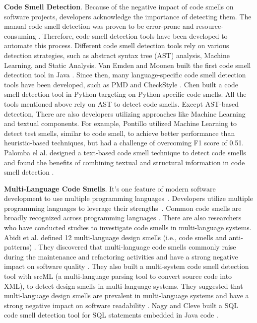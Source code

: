 {\bf Code Smell Detection}. Because of the negative impact of code smells on
software projects, developers acknowledge the importance of detecting them. The
manual code smell detection was proven to be error-prone and resource-consuming
\cite{DetectingDefectsInObject}. Therefore, code smell detection tools have been
developed to automate this process. Different code smell detection tools rely on
various detection strategies, such as abstract syntax tree (AST) analysis,
Machine Learning, and Static Analysis. Van Emden and Moonen built the first code
smell detection tool in Java \cite{1173068}. Since then, many language-specific
code smell detection tools have been developed, such as PMD \cite{PMD} and
CheckStyle \cite{CheckStyle}. Chen \cite{Pysmell} built a code smell detection
tool in Python targeting on Python specific code smells. All the tools mentioned
above rely on AST to detect code smells. Except AST-based detection, There are
also developers utilizing approaches like Machine Learning and textual
components. For example, Pontillo utilized Machine Learning to detect test
smells, similar to code smell, to achieve better performance than
heuristic-based techniques, but had a challenge of overcoming F1 score of 0.51.
Palomba el al. designed a text-based code smell technique to detect code smells
and found the benefits of combining textual and structural information in code
smell detection \cite{Palomba}.


{\bf Multi-Language Code Smells}. It's one feature of modern software
development to use multiple programming languages~\cite{723183}. Developers
utilize multiple programming languages to leverage their
strengths~\cite{7476675}.
%
Common code smells are broadly recognized across programming languages
\cite{PMD,CheckStyle,Pysmell,Jscent,DesigniteJava}. There are also researchers
who have conducted studies to investigate code smells in multi-language systems.
Abidi et al. defined 12 multi-language design smells (i.e., code smells and
anti-patterns) \cite{MultiLanguageCodeSmells}. They discovered that
multi-language code smells commonly raise during the maintenance and refactoring
activities and have a strong negative impact on software quality \cite{Abidi2}.
They also built a multi-system code smell detection tool with srcML (a
multi-language parsing tool to convert source code into XML), to detect design
smells in multi-language systems. They suggested that multi-language design
smells are prevalent in multi-language systems and have a strong negative impact
on software readability \cite{Fault-Prone}. Nagy and Cleve built a SQL code
smell detection tool for SQL statements embedded in Java code \cite{SQLInJava}.
